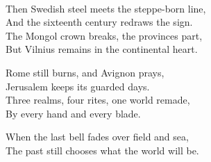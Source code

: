 \begin{lyrics}
\\
Then Swedish steel meets the steppe-born line,\\
And the sixteenth century redraws the sign.\\
The Mongol crown breaks, the provinces part,\\
But Vilnius remains in the continental heart.

Rome still burns, and Avignon prays,\\
Jerusalem keeps its guarded days.\\
Three realms, four rites, one world remade,\\
By every hand and every blade.

When the last bell fades over field and sea,\\
The past still chooses what the world will be.
\end{lyrics}

